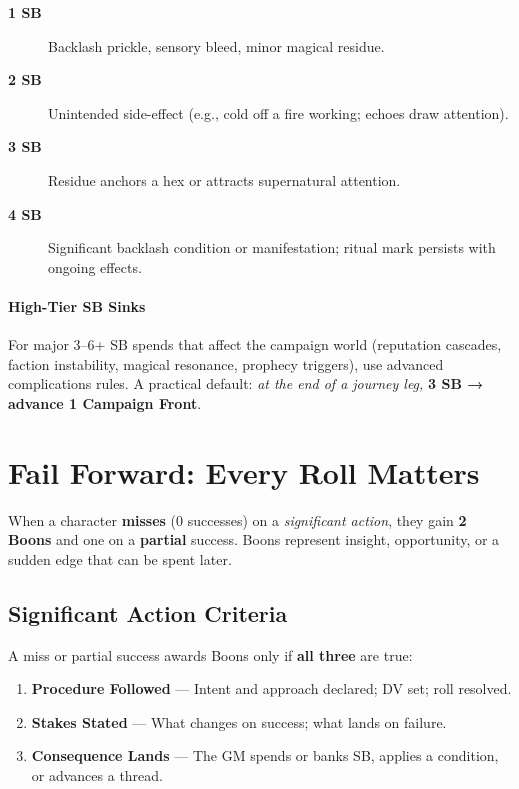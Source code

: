 \begin{description}
\item[\textbf{1 SB}] Backlash prickle, sensory bleed, minor magical residue.
\item[\textbf{2 SB}] Unintended side-effect (e.g., cold off a fire working; echoes draw attention).
\item[\textbf{3 SB}] Residue anchors a hex or attracts supernatural attention.
\item[\textbf{4 SB}] Significant backlash condition or manifestation; ritual mark persists with ongoing effects.
\end{description}

\paragraph{High-Tier SB Sinks} 
For major 3–6+ SB spends that affect the campaign world (reputation cascades, faction instability, magical resonance, prophecy triggers), use advanced complications rules. A practical default: \emph{at the end of a journey leg,} \textbf{3 SB → advance 1 Campaign Front}.

\section{Fail Forward: Every Roll Matters}
\label{sec:fail-forward}

When a character \textbf{misses} (0 successes) on a \emph{significant action}, they gain \textbf{2 Boons} and one on a \textbf{partial} success. Boons represent insight, opportunity, or a sudden edge that can be spent later.

\subsection{Significant Action Criteria}
\label{subsec:significant-action}

A miss or partial success awards Boons only if \textbf{all three} are true:
\begin{enumerate}
\item \textbf{Procedure Followed} — Intent and approach declared; DV set; roll resolved. 
\item \textbf{Stakes Stated} — What changes on success; what lands on failure. 
\item \textbf{Consequence Lands} — The GM spends or banks SB, applies a condition, or advances a thread. 
\end{enumerate}


